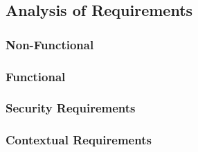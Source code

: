 \subsection{Analysis of Requirements}

\subsubsection{Non-Functional}

\subsubsection{Functional}

\subsubsection{Security Requirements}

\subsubsection{Contextual Requirements}

